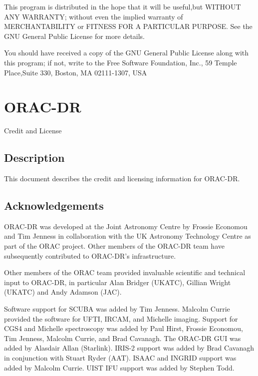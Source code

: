 \documentclass[twoside,11pt]{article}
\renewcommand{\_}{\texttt{\symbol{95}}}
\begin{document}
This program is distributed in the hope that it will be useful,but WITHOUT ANY
WARRANTY; without even the implied warranty of MERCHANTABILITY or FITNESS FOR A
PARTICULAR PURPOSE. See the GNU General Public License for more details.



You should have received a copy of the GNU General Public License along with
this program; if not, write to the Free Software Foundation, Inc., 59 Temple
Place,Suite 330, Boston, MA  02111-1307, USA


\section{ORAC-DR\label{ORAC-DR}}


Credit and License

\subsection*{Description\label{ORAC-DR_Description}}


This document describes the credit and licensing information for ORAC-DR.

\subsection*{Acknowledgements\label{ORAC-DR_Acknowledgements}}


ORAC-DR was developed at the Joint Astronomy Centre by
Frossie Economou and Tim Jenness in collaboration with the
UK Astronomy Technology Centre as part of the ORAC project. 
Other members of the ORAC-DR team have subsequently contributed
to ORAC-DR's infrastructure.



Other members of the ORAC team provided invaluable scientific 
and technical input to ORAC-DR, in particular Alan Bridger (UKATC),
Gillian Wright (UKATC) and Andy Adamson (JAC).



Software support for SCUBA was added by Tim Jenness.  Malcolm Currie
provided the software for UFTI, IRCAM, and Michelle imaging.  Support
for CGS4 and Michelle spectroscopy was added by Paul Hirst, Frossie
Economou, Tim Jenness, Malcolm Currie, and Brad Cavanagh.  The ORAC-DR
GUI was added by Alasdair Allan (Starlink). IRIS-2 support was added
by Brad Cavanagh in conjunction with Stuart Ryder (AAT). ISAAC and
INGRID support was added by Malcolm Currie. UIST IFU support was added
by Stephen Todd.
\end{document}
